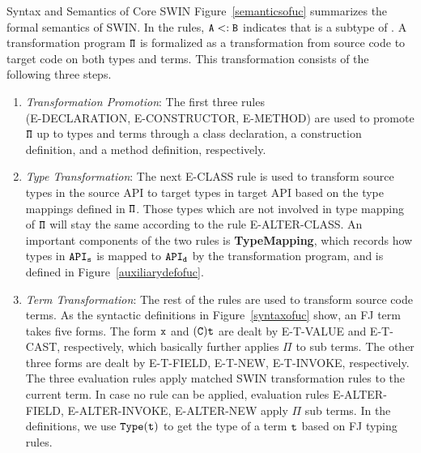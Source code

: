 \begin{section}{Syntax and Semantics of Core SWIN}
Figure~\ref{semanticsofuc} summarizes the formal semantics of SWIN.
In the rules, $\tt A <: B$ indicates that  is a subtype of . A transformation program $\tt\Pi$ is formalized as a transformation from 
source code to target code on both types and terms. This transformation consists of the following three steps.

\begin{enumerate}
\item {\em Transformation Promotion}: The first three rules \\(E-DECLARATION, E-CONSTRUCTOR, E-METHOD)
are used to promote $\tt\Pi$ up to types and terms through a class declaration, a
construction definition, and a method definition, respectively.

\item {\em Type Transformation}: The next E-CLASS rule is used to transform source types in the source API to target types in target API
  based on the type mappings defined in $\tt\Pi$. Those types which
  are not involved in type mapping of $\tt \Pi$ will stay the same
  according to the rule E-ALTER-CLASS. An important components of the
  two rules is \textbf{TypeMapping}, which records how types in $\tt
  API_s$ is mapped to $\tt API_d$ by the transformation program, and
  is defined in Figure~\ref{auxiliarydefofuc}.
  

\item {\em Term Transformation}: The rest of the rules are used to
  transform source code terms. As the syntactic definitions in
  Figure~\ref{syntaxofuc} show, an FJ term takes five forms. The form
  $\tt x$ and $\tt (C)t$ are dealt by E-T-VALUE and E-T-CAST,
  respectively, which basically further applies $\Pi$ to sub terms.
  The other three forms are dealt by E-T-FIELD, E-T-NEW, E-T-INVOKE,
  respectively. The three evaluation rules apply matched SWIN transformation
  rules to the current term. In case no rule can be applied,
  evaluation rules E-ALTER-FIELD, E-ALTER-INVOKE, E-ALTER-NEW apply
  $\Pi$ sub terms. In the definitions, we use $\tt Type(t)$ to get the
  type of a term $\tt t$ based on FJ typing rules.


\end{enumerate}
\end{section}
